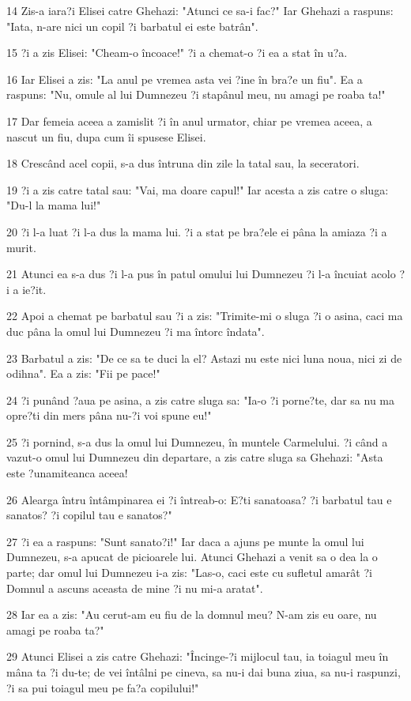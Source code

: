 \par 14 Zis-a iara?i Elisei catre Ghehazi: "Atunci ce sa-i fac?" Iar Ghehazi a raspuns: "Iata, n-are nici un copil ?i barbatul ei este batrân".
\par 15 ?i a zis Elisei: "Cheam-o încoace!" ?i a chemat-o ?i ea a stat în u?a.
\par 16 Iar Elisei a zis: "La anul pe vremea asta vei ?ine în bra?e un fiu". Ea a raspuns: "Nu, omule al lui Dumnezeu ?i stapânul meu, nu amagi pe roaba ta!"
\par 17 Dar femeia aceea a zamislit ?i în anul urmator, chiar pe vremea aceea, a nascut un fiu, dupa cum îi spusese Elisei.
\par 18 Crescând acel copii, s-a dus întruna din zile la tatal sau, la seceratori.
\par 19 ?i a zis catre tatal sau: "Vai, ma doare capul!" Iar acesta a zis catre o sluga: "Du-l la mama lui!"
\par 20 ?i l-a luat ?i l-a dus la mama lui. ?i a stat pe bra?ele ei pâna la amiaza ?i a murit.
\par 21 Atunci ea s-a dus ?i l-a pus în patul omului lui Dumnezeu ?i l-a încuiat acolo ?i a ie?it.
\par 22 Apoi a chemat pe barbatul sau ?i a zis: "Trimite-mi o sluga ?i o asina, caci ma duc pâna la omul lui Dumnezeu ?i ma întorc îndata".
\par 23 Barbatul a zis: "De ce sa te duci la el? Astazi nu este nici luna noua, nici zi de odihna". Ea a zis: "Fii pe pace!"
\par 24 ?i punând ?aua pe asina, a zis catre sluga sa: "Ia-o ?i porne?te, dar sa nu ma opre?ti din mers pâna nu-?i voi spune eu!"
\par 25 ?i pornind, s-a dus la omul lui Dumnezeu, în muntele Carmelului. ?i când a vazut-o omul lui Dumnezeu din departare, a zis catre sluga sa Ghehazi: "Asta este ?unamiteanca aceea!
\par 26 Alearga întru întâmpinarea ei ?i întreab-o: E?ti sanatoasa? ?i barbatul tau e sanatos? ?i copilul tau e sanatos?"
\par 27 ?i ea a raspuns: "Sunt sanato?i!" Iar daca a ajuns pe munte la omul lui Dumnezeu, s-a apucat de picioarele lui. Atunci Ghehazi a venit sa o dea la o parte; dar omul lui Dumnezeu i-a zis: "Las-o, caci este cu sufletul amarât ?i Domnul a ascuns aceasta de mine ?i nu mi-a aratat".
\par 28 Iar ea a zis: "Au cerut-am eu fiu de la domnul meu? N-am zis eu oare, nu amagi pe roaba ta?"
\par 29 Atunci Elisei a zis catre Ghehazi: "Încinge-?i mijlocul tau, ia toiagul meu în mâna ta ?i du-te; de vei întâlni pe cineva, sa nu-i dai buna ziua, sa nu-i raspunzi, ?i sa pui toiagul meu pe fa?a copilului!"
